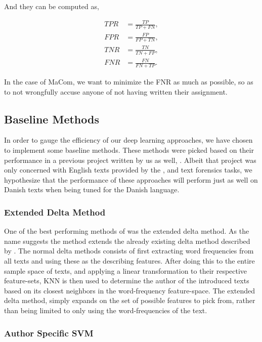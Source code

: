And they can be computed as,

\begin{align}
    TPR &= \frac{TP}{TP + FN}, \\
    FPR &= \frac{FP}{FP + TN}, \\
    TNR &= \frac{TN}{TN + FP}, \\
    FNR &= \frac{FN}{FN + TP}.
\end{align}

In the case of MaCom, we want to minimize the \gls{FNR} as much as possible, so
as to not wrongfully accuse anyone of not having written their assignment.




\subsection{Baseline Methods}

In order to gauge the efficiency of our deep learning approaches, we have
chosen to implement some baseline methods. These methods were picked
based on their performance in a previous project written by us as well,
\cite{US}. Albeit that project was only concerned with English texts
provided by the \cite{pan:2015}, and \cite{pan:2014} text forensics tasks,
we hypothesize that the performance of these approaches will perform just
as well on Danish texts when being tuned for the Danish language.


\subsubsection{Extended Delta Method}

One of the best performing methods of \cite{US} was the extended delta method.
As the name suggests the method extends the already existing delta method
described by \cite{evert2015towards}. The normal delta methods consists of first
extracting word frequencies from all texts and using these as the describing
features. After doing this to the entire sample space of texts, and applying a
linear transformation to their respective feature-sets, \gls{KNN} is then used
to determine the author of the introduced texts based on its closest neighbors
in the word-frequency feature-space. The extended delta method, simply expands
on the set of possible features to pick from, rather than being limited to only
using the word-frequencies of the text.


\subsubsection{Author Specific SVM}

